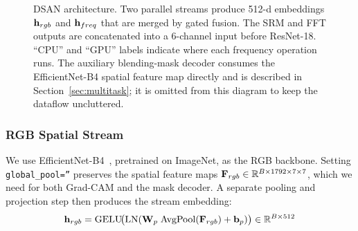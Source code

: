 \begin{figure}[t]
\caption{DSAN architecture. Two parallel streams produce 512-d embeddings $\mathbf{h}_{rgb}$ and $\mathbf{h}_{freq}$ that are merged by gated fusion. The SRM and FFT outputs are concatenated into a 6-channel input before ResNet-18. ``CPU'' and ``GPU'' labels indicate where each frequency operation runs. The auxiliary blending-mask decoder consumes the EfficientNet-B4 spatial feature map directly and is described in Section~\ref{sec:multitask}; it is omitted from this diagram to keep the dataflow uncluttered.}
\label{fig:dsan_arch}
\end{figure}

\subsubsection{RGB Spatial Stream}
We use EfficientNet-B4~\cite{tan2019efficientnet}, pretrained on ImageNet, as the RGB backbone. Setting \texttt{global\_pool=''} preserves the spatial feature maps $\mathbf{F}_{rgb} \in \mathbb{R}^{B \times 1792 \times 7 \times 7}$, which we need for both Grad-CAM and the mask decoder. A separate pooling and projection step then produces the stream embedding:
\begin{equation}
    \mathbf{h}_{rgb} = \text{GELU}\!\big(\text{LN}(\mathbf{W}_p\;\text{AvgPool}(\mathbf{F}_{rgb}) + \mathbf{b}_p)\big) \in \mathbb{R}^{B \times 512}
    \label{eq:rgb}
\end{equation}

